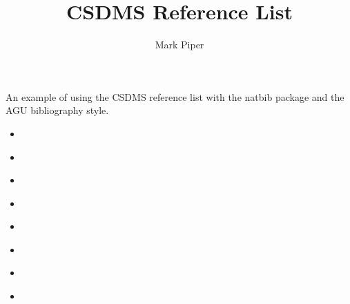\documentclass[11pt]{article}
\begin{document}
\title{CSDMS Reference List}
\author{Mark Piper}
\maketitle

An example of using the CSDMS reference list
with the natbib package
and the AGU bibliography style.

\begin{itemize}
\item \citep{tucker2010modeling}
\item \citet{overeem2015strategies}
\item \citep{kettner2008hydrotrend}
\item \citet{hutton2008sedflux}
\item \citep{piper2015wmt}
\item \citet{blanca2017compute}
\item \citep{jupyter2015notebook}
\item \citet{gdal2017gdal}
\end{itemize}



\end{document}
